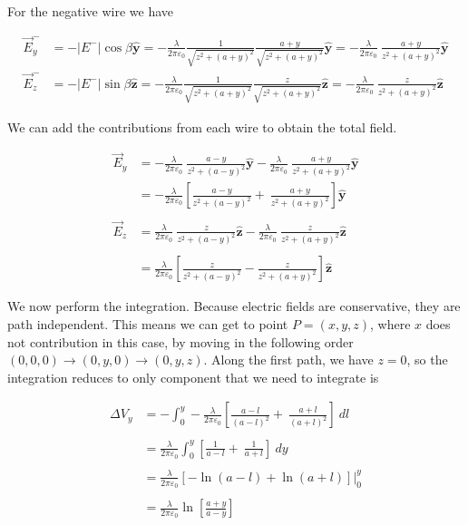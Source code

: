\documentclass{article}
\newcommand{\bvec}[1]{\mathbf{\hat{#1}}}
\begin{document}
For the negative wire we have 

\begin{align*}
    \vec{E}^-_y &= -|E^-|\cos{\beta}\bvec{y} = -\frac{\lambda}{2\pi\varepsilon_0}\frac{1}{\sqrt{z^2 + (a + y)^2}} \frac{a + y}{\sqrt{z^2 + (a + y)^2}} \bvec{y}
    = -\frac{\lambda}{2\pi\varepsilon_0}\ \frac{a + y}{z^2 + (a + y)^2}\bvec{y}\\
    \vec{E}^-_z &= -|E^-|\sin{\beta}\bvec{z} = -\frac{\lambda}{2\pi\varepsilon_0}\frac{1}{\sqrt{z^2 + (a + y)^2}} \frac{z}{\sqrt{z^2 + (a + y)^2}} \bvec{z}
    = -\frac{\lambda}{2\pi\varepsilon_0}\ \frac{z}{z^2 + (a + y)^2}\bvec{z}
\end{align*}

We can add the contributions from each wire to obtain the total field. 

\begin{align*}
    \vec{E}_y &= -\frac{\lambda}{2\pi\varepsilon_0}\ \frac{a - y}{z^2 + (a - y)^2}\bvec{y}  -\frac{\lambda}{2\pi\varepsilon_0}\ \frac{a + y}{z^2 + (a + y)^2}\bvec{y} \\ 
    &= - \frac{\lambda}{2\pi \varepsilon_0}\left[ \frac{a - y}{z^2 + (a - y)^2} +  \ \frac{a + y}{z^2 + (a + y)^2} \right] \bvec{y}\\
    \\
    \vec{E}_z &= \frac{\lambda}{2\pi\varepsilon_0}\ \frac{z}{z^2 + (a - y)^2}
    \bvec{z} - \frac{\lambda}{2\pi\varepsilon_0}\ \frac{z}{z^2 + (a + y)^2}\bvec{z}\\
    \\
    &= \frac{\lambda}{2\pi\varepsilon_0} \left[ \frac{z}{z^2 + (a - y)^2} - \frac{z}{z^2 + (a + y)^2} \right]\bvec{z}
\end{align*}

We now perform the integration. Because electric fields are conservative, they are path independent. This means we can get to point $P = (x, y, z)$, where $x$ does not contribution in this case, by moving in the following order $(0, 0, 0) \rightarrow (0, y, 0) \rightarrow (0, y, z)$.  Along the first path, we have $z = 0$, so the integration reduces to only component that we need to integrate is 

\begin{align*}
    \Delta V_y &= -\int_0^y - \frac{\lambda}{2\pi \varepsilon_0}\left[ \frac{a - l}{(a - l)^2} +  \ \frac{a + l}{(a + l)^2} \right] \ dl \\
    \\
    &= \frac{\lambda}{2\pi \varepsilon_0} \int_0^y \left[ \frac{1}{a - l} +  \ \frac{1}{a + l} \right] \ dy \\
    \\
    &= \frac{\lambda}{2\pi \varepsilon_0} \left[ -\ln(a - l) + \ln(a + l) \right]\bigg |^y_0 \\
    \\
    &= \frac{\lambda}{2\pi \varepsilon_0} \ln\left[\frac{a + y}{a - y}\right]
\end{align*}
\end{document}

